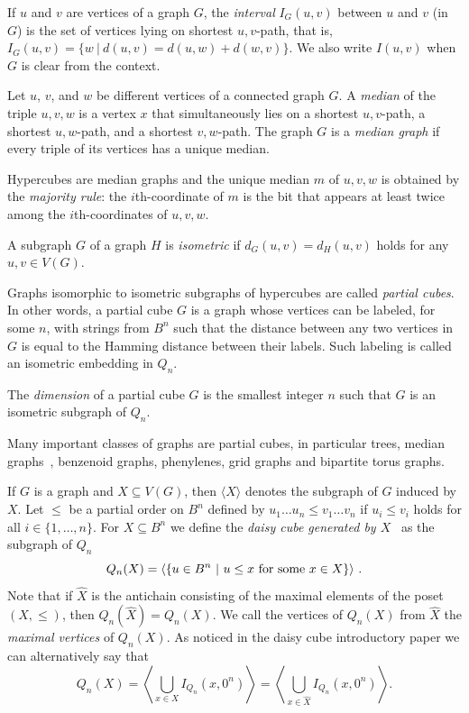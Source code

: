 \documentclass[11pt]{article}
\newcommand{\st}{ ~|~ }
\begin{document}
If $u$ and $v$ are vertices of a graph $G$, the \emph{interval} $I_G(u,v)$ between $u$ and $v$ (in $G$) is the set of vertices lying on shortest $u,v$-path, that is, $I_G(u,v) = \{w\st d(u,v) = d(u,w) + d(w,v)\}$. We also write $I(u,v)$ when $G$ is clear from the context. 



Let $u$, $v$, and $w$ be different vertices of a connected graph $G$. 
A {\em median} of the triple $u,v,w$ 
is a vertex $x$ that simultaneously lies on a shortest $u,v$-path, a shortest $u,w$-path, and a shortest $v,w$-path.
The graph $G$ is a {\em median graph} if every 
triple of its vertices has a unique median. 

Hypercubes are median graphs and the unique median $m$ of $u,v,w$ is obtained  by the {\em majority rule}: the $i$th-coordinate of $m$ is the bit that appears at least twice among the $i$th-coordinates of  $u,v,w$.

A subgraph $G$ of a graph $H$ is {\em isometric} if $d_G(u,v) = d_H(u,v)$ holds for any $u,v\in V(G)$. 

Graphs isomorphic to isometric subgraphs of hypercubes are  called \emph{partial cubes}. In other words, a partial cube $G$ is a graph whose vertices can be labeled, for some $n$, with strings from $B^n$ such that the distance between any two vertices in $G$ is equal to the Hamming distance between their labels. Such labeling is called an isometric embedding in $Q_n$.
 
The {\em dimension} of a partial cube $G$ is the smallest integer
$n$ such that $G$ is an isometric subgraph of $Q_n$.
 
Many important classes of graphs are partial cubes, 
in particular trees, median graphs~\cite{M-1980}, benzenoid graphs, phenylenes, 
grid graphs and bipartite torus graphs.

If $G$ is a graph and $X\subseteq V(G)$, then $\langle X\rangle$ denotes the subgraph of $G$ induced by $X$.  
Let $\le$ be a partial order on $B^n$ defined by $u_1\ldots u_n \le v_1\ldots v_n$ if $u_i\le v_i$ holds for all $i\in \{1,\ldots,n\}$. For $X \subseteq B^n$ we define the {\em daisy cube generated by $X$}~\cite{KM-2019a} as the subgraph of $Q_n$  
$$Q_n(X) =\left\langle \{u\in B^n\st u\le x\ {\rm for\ some}\ x\in X \} \right\rangle\,.$$
 Note that  if $\widehat{X}$ is the antichain consisting of the maximal elements of the poset $(X,\le)$, then $Q_n(\widehat{X}) = Q_n(X)$. We call the vertices of $Q_n(X)$ from  $\widehat{X}$ the {\em maximal vertices} of $Q_n(X)$. As noticed in the daisy cube introductory paper \cite{KM-2019a} we can alternatively say that $$Q_n(X) = \left\langle \bigcup_{x\in X} I_{Q_n}(x,0^n)\right\rangle=\left\langle \bigcup_{x\in \widehat{X}} I_{Q_n}(x,0^n)\right\rangle.$$
\end{document}
